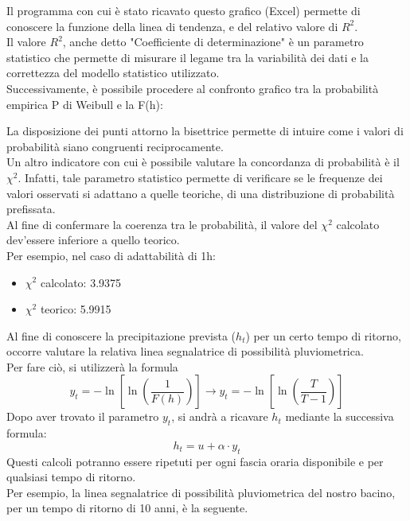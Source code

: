 Il programma con cui è stato ricavato questo grafico (Excel) permette di conoscere la funzione della linea di tendenza, e del relativo valore di $R^2$. \\
Il valore $R^2$, anche detto "Coefficiente di determinazione" è un parametro statistico che permette di misurare il legame tra la variabilità dei dati e la correttezza del modello statistico utilizzato. \cite{r_quadro} \\
Successivamente, è possibile procedere al confronto grafico tra la probabilità empirica P di Weibull e la F(h):

La disposizione dei punti attorno la bisettrice permette di intuire come i valori di probabilità siano congruenti reciprocamente.\\
Un altro indicatore con cui è possibile valutare la concordanza di probabilità è il $\chi ^2$. Infatti, tale parametro statistico permette di verificare se le frequenze dei valori osservati si adattano a quelle teoriche, di una distribuzione di probabilità prefissata.\\
Al fine di confermare la coerenza tra le probabilità, il valore del $\chi ^2$ calcolato dev'essere inferiore a quello teorico.\\
Per esempio, nel caso di adattabilità di 1h: 
\begin{itemize}
    \item $\chi ^2$ calcolato: 3.9375
    \item $\chi ^2$ teorico: 5.9915
\end{itemize}
Al fine di conoscere la precipitazione prevista ($h_t$) per un certo tempo di ritorno, occorre valutare la relativa linea segnalatrice di possibilità pluviometrica.\\
Per fare ciò, si utilizzerà la formula 
\begin{equation}
    y_{t}= -\ln \left[ \ln \left(\frac{1}{F(h)} \right) \right] \rightarrow y_{t}= -\ln \left[ \ln \left(\frac{T}{T-1} \right) \right]
    \label{variabile_ridotta}
\end{equation}
Dopo aver trovato il parametro $y_t$, si andrà a ricavare $h_t$ mediante la successiva formula:
\begin{equation}
h_t = u + \alpha \cdot y_t    
\label{h_t}
\end{equation}
Questi calcoli potranno essere ripetuti per ogni fascia oraria disponibile e per qualsiasi tempo di ritorno.\\
Per esempio, la linea segnalatrice di possibilità pluviometrica del nostro bacino, per un tempo di ritorno di 10 anni, è la seguente.

